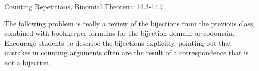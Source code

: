 \documentclass[handout]{mcs}
\begin{document}
 
 
 
\begin{staffnotes} 
Counting Repetitions, Binomial Theorem: 14.3-14.7 
\end{staffnotes} 
 
 
 
\begin{staffnotes} 
The following problem is really a review of the bijections from the 
previous class, combined with bookkeeper formulas for the bijection 
domain or codomain.  Encourage students to describe the bijections 
explicitly, pointing out that mistakes in counting arguments often are 
the result of a correspondence that is not a bijection. 
\end{staffnotes} 
 
 
 
 
\end{document}

